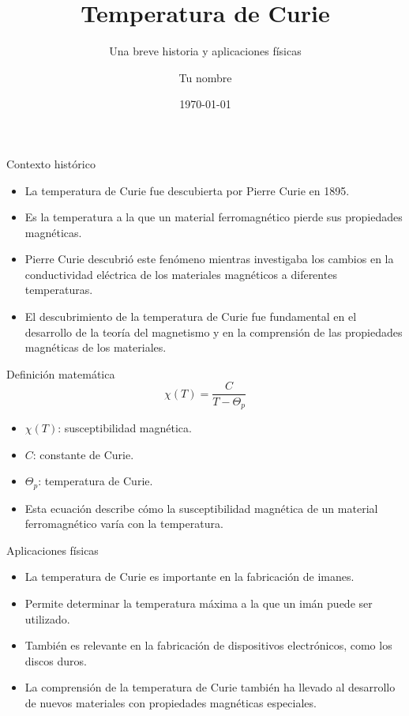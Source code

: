 \documentclass{beamer}
\title[Temperatura de Curie]{Temperatura de Curie}
\subtitle{Una breve historia y aplicaciones físicas}
\author[Tu nombre]{Tu nombre}
\institute[Tu institución]{Tu institución}
\date{\today}
\begin{document}
\begin{frame}
    \titlepage
\end{frame}

\begin{frame}{Contexto histórico}
    \begin{itemize}
        \item La temperatura de Curie fue descubierta por Pierre Curie en 1895.
        \item Es la temperatura a la que un material ferromagnético pierde sus propiedades magnéticas.
        \item Pierre Curie descubrió este fenómeno mientras investigaba los cambios en la conductividad eléctrica de los materiales magnéticos a diferentes temperaturas.
        \item El descubrimiento de la temperatura de Curie fue fundamental en el desarrollo de la teoría del magnetismo y en la comprensión de las propiedades magnéticas de los materiales.
    \end{itemize}
\end{frame}

\begin{frame}{Definición matemática}
    \begin{equation*}
        \chi\left(T\right) = \frac{C}{T - \Theta_p}
    \end{equation*}
    \begin{itemize}
        \item $\chi(T)$: susceptibilidad magnética.
        \item $C$: constante de Curie.
        \item $\Theta_p$: temperatura de Curie.
        \item Esta ecuación describe cómo la susceptibilidad magnética de un material ferromagnético varía con la temperatura.
    \end{itemize}
\end{frame}

\begin{frame}{Aplicaciones físicas}
    \begin{itemize}
        \item La temperatura de Curie es importante en la fabricación de imanes.
        \item Permite determinar la temperatura máxima a la que un imán puede ser utilizado.
        \item También es relevante en la fabricación de dispositivos electrónicos, como los discos duros.
        \item La comprensión de la temperatura de Curie también ha llevado al desarrollo de nuevos materiales con propiedades magnéticas especiales.
    \end{itemize}
\end{frame}
\end{document}
